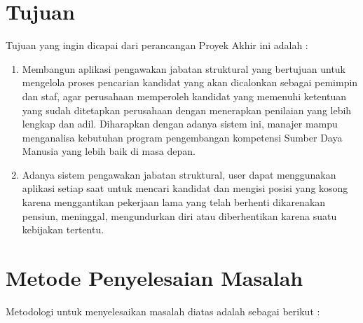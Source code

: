 \section{Tujuan}
Tujuan yang ingin dicapai dari perancangan Proyek Akhir ini adalah :

\begin{enumerate}
	\item Membangun aplikasi pengawakan jabatan struktural yang bertujuan untuk mengelola proses pencarian kandidat yang akan dicalonkan sebagai pemimpin dan staf, agar perusahaan memperoleh kandidat yang memenuhi ketentuan yang sudah ditetapkan perusahaan dengan menerapkan penilaian yang lebih lengkap dan adil. Diharapkan dengan adanya sistem ini, manajer mampu menganalisa kebutuhan program pengembangan kompetensi Sumber Daya Manusia yang lebih baik di masa depan.
	\item Adanya sistem pengawakan jabatan struktural, user dapat menggunakan aplikasi setiap saat untuk mencari kandidat dan mengisi posisi yang kosong karena menggantikan pekerjaan lama yang telah berhenti dikarenakan pensiun, meninggal, mengundurkan diri atau diberhentikan karena suatu kebijakan tertentu.
\end{enumerate}

\section{Metode Penyelesaian Masalah}
Metodologi untuk menyelesaikan masalah diatas adalah sebagai berikut :

